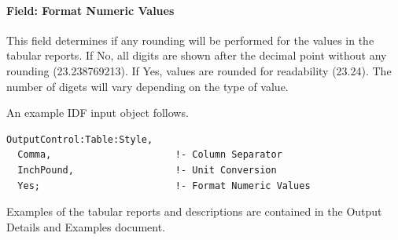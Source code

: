 \paragraph{Field: Format Numeric Values}\label{field-format-numeric-values-tablestyle}

This field determines if any rounding will be performed for the values in the tabular reports. If No, all digits are shown after the decimal point without any rounding (23.238769213). If Yes, values are rounded for readability (23.24). The number of digets will vary depending on the type of value.

An example IDF input object follows.

\begin{lstlisting}
OutputControl:Table:Style,
  Comma,                      !- Column Separator
  InchPound,                  !- Unit Conversion
  Yes;                        !- Format Numeric Values
\end{lstlisting}

Examples of the tabular reports and descriptions are contained in the Output Details and Examples document.